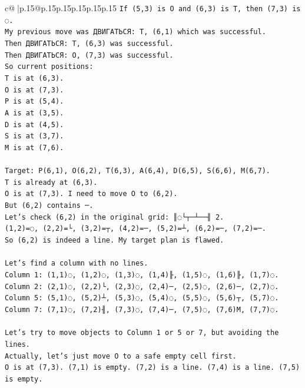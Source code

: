 \documentclass{article}
\begin{document}
{\begin{supertabular}{c@{$\;$}|p{.15\linewidth}@{}p{.15\linewidth}p{.15\linewidth}p{.15\linewidth}p{.15\linewidth}p{.15\linewidth}}
{{{\texttt{If (5,3) is O and (6,3) is T, then (7,3) is ◌.} \\
\texttt{My previous move was ДВИГАТЬСЯ: T, (6,1) which was successful.} \\
\texttt{Then ДВИГАТЬСЯ: T, (6,3) was successful.} \\
\texttt{Then ДВИГАТЬСЯ: O, (7,3) was successful.} \\
\texttt{So current positions:} \\
\texttt{T is at (6,3).} \\
\texttt{O is at (7,3).} \\
\texttt{P is at (5,4).} \\
\texttt{A is at (3,5).} \\
\texttt{D is at (4,5).} \\
\texttt{S is at (3,7).} \\
\texttt{M is at (7,6).} \\
\\ 
\texttt{Target: P(6,1), O(6,2), T(6,3), A(6,4), D(6,5), S(6,6), M(6,7).} \\
\texttt{T is already at (6,3).} \\
\texttt{O is at (7,3). I need to move O to (6,2).} \\
\texttt{But (6,2) contains ─.} \\
\texttt{Let's check (6,2) in the original grid: ║◌└┬─┴──╢ 2.} \\
\texttt{(1,2)=◌, (2,2)=└, (3,2)=┬, (4,2)=─, (5,2)=┴, (6,2)=─, (7,2)=─.} \\
\texttt{So (6,2) is indeed a line. My target plan is flawed.} \\
\\ 
\texttt{Let's find a column with no lines.} \\
\texttt{Column 1: (1,1)◌, (1,2)◌, (1,3)◌, (1,4)╟, (1,5)◌, (1,6)╟, (1,7)◌.} \\
\texttt{Column 2: (2,1)◌, (2,2)└, (2,3)◌, (2,4)─, (2,5)◌, (2,6)─, (2,7)◌.} \\
\texttt{Column 5: (5,1)◌, (5,2)┴, (5,3)◌, (5,4)◌, (5,5)◌, (5,6)┬, (5,7)◌.} \\
\texttt{Column 7: (7,1)◌, (7,2)╢, (7,3)◌, (7,4)─, (7,5)◌, (7,6)M, (7,7)◌.} \\
\\ 
\texttt{Let's try to move objects to Column 1 or 5 or 7, but avoiding the lines.} \\
\texttt{Actually, let's just move O to a safe empty cell first.} \\
\texttt{O is at (7,3). (7,1) is empty. (7,2) is a line. (7,4) is a line. (7,5) is empty.} \\
}}}
\end{supertabular}}
\end{document}
